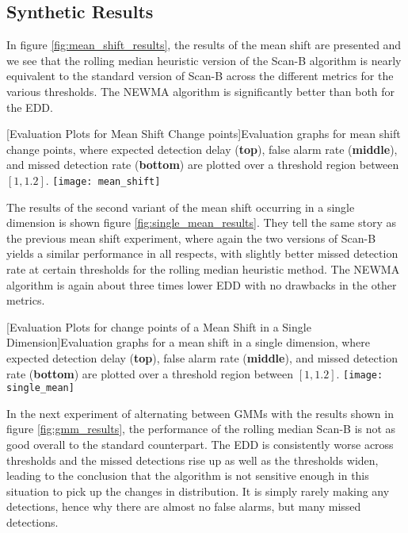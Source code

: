 \subsection{Synthetic Results}
In figure \ref{fig:mean_shift_results}, the results of the mean shift are presented and we see that the rolling median heuristic version of the Scan-B algorithm is nearly equivalent to the standard version of Scan-B across the different metrics for the various thresholds. The NEWMA algorithm is significantly better than both for the EDD.
\begin{center} 
[Evaluation Plots for Mean Shift Change points]{Evaluation graphs for mean shift change points, where expected detection delay (\textbf{top}), false alarm rate (\textbf{middle}), and missed detection rate (\textbf{bottom}) are plotted over a threshold region between $[1,1.2]$. } 
\texttt{[image: mean\_shift]} 
\label{fig:mean_shift_results} 
\end{center}

The results of the second variant of the mean shift occurring in a single dimension is shown figure \ref{fig:single_mean_results}. They tell the same story as the previous mean shift experiment, where again the two versions of Scan-B yields a similar performance in all respects, with slightly better missed detection rate at certain thresholds for the rolling median heuristic method. The NEWMA algorithm is again about three times lower EDD with no drawbacks in the other metrics.

\begin{center} 
[Evaluation Plots for change points of a Mean Shift in a Single Dimension]{Evaluation graphs for a mean shift in a single dimension, where expected detection delay (\textbf{top}), false alarm rate (\textbf{middle}), and missed detection rate (\textbf{bottom}) are plotted over a threshold region between $[1,1.2]$. } 
\texttt{[image: single\_mean]} 
\label{fig:single_mean_results} 
\end{center}

In the next experiment of alternating between GMMs with the results shown in figure \ref{fig:gmm_results}, the performance of the rolling median Scan-B is not as good overall to the standard counterpart. The EDD is consistently worse across thresholds and the missed detections rise up as well as the thresholds widen, leading to the conclusion that the algorithm is not sensitive enough in this situation to pick up the changes in distribution. It is simply rarely making any detections, hence why there are almost no false alarms, but many missed detections.

